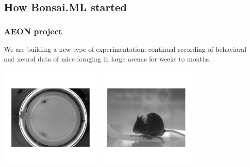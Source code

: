 \subsection{How Bonsai.ML started}

\begin{frame}
    \frametitle{AEON project}

    We are building a new type of experimentation:
    continual recording of behavioral and neural data of mice foraging in large
    arenas for weeks to months.

    \begin{center}
        \includegraphics[width=2in]{figures/foragingMouse.png}
        \includegraphics[width=2in]{figures/mouseOnWheel.png}
    \end{center}

\end{frame}

